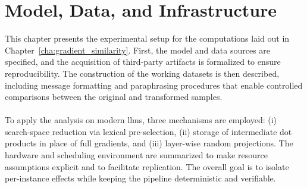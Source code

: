 \chapter{Model, Data, and Infrastructure}
This chapter presents the experimental setup for the computations laid out in Chapter~\ref{cha:gradient_similarity}. First, the model and data sources are specified, and the acquisition of third-party artifacts is formalized to ensure reproducibility. The construction of the working datasets is then described, including message formatting and paraphrasing procedures that enable controlled comparisons between the original and transformed samples.
\\\\
To apply the analysis on modern \acrshort{llm}s, three mechanisms are employed: (i) search-space reduction via lexical pre-selection, (ii) storage of intermediate dot products in place of full gradients, and (iii) layer-wise random projections. The hardware and scheduling environment are summarized to make resource assumptions explicit and to facilitate replication. The overall goal is to isolate per-instance effects while keeping the pipeline deterministic and verifiable.

